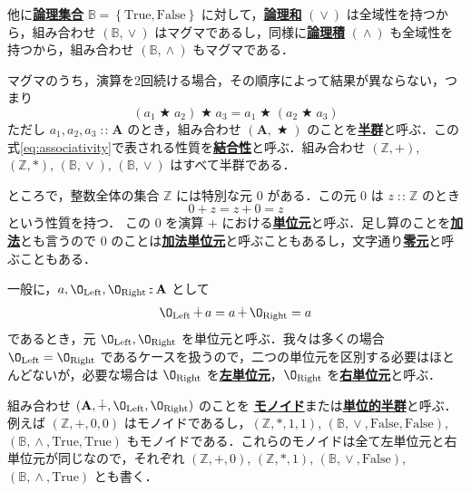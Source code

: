 \documentclass[a4paper,twocolumn]{jsbook}
\newcommand{\keyword}[1]{{\underline{\textbf{#1}}}}
\newcommand{\mSpecialConst}[1]{\mathrm{#1}} %
\newcommand{\mFalse}{\mSpecialConst{False}}
\newcommand{\mTrue}{\mSpecialConst{True}}
\newcommand{\mZero}{\O}
\DeclareMathOperator{\mBinOp}{\bigstar}
\DeclareMathOperator{\mIn}{{:\!:}}
\DeclareMathOperator{\mLogicalAnd}{\wedge}
\DeclareMathOperator{\mLogicalOr}{\vee}
\DeclareMathOperator{\mPlus}{\dotplus}
\newcommand{\mSpecialSub}[1]{\text{#1}}
\newcommand{\mLeft}{\mSpecialSub{Left}}
\newcommand{\mRight}{\mSpecialSub{Right}}
\newcommand{\mSet}[1]{\mathbf{#1}}
\newcommand{\mSpecialSet}[1]{\mathbb{#1}} %
\newcommand{\mBSet}{\mSpecialSet{B}}
\newcommand{\mZSet}{\mSpecialSet{Z}}
\newcommand{\mSetWith}[1]{\left\{#1\right\}}
\newcommand{\mTupleWith}[1]{\left(#1\right)}
\begin{document}
他に\keyword{論理集合} $\mBSet=\mSetWith{\mTrue,\mFalse}$ に対して，\keyword{論理和} $(\mLogicalOr)$ は全域性を持つから，組み合わせ $\mTupleWith{\mBSet,\mLogicalOr}$ はマグマであるし，同様に\keyword{論理積} $(\mLogicalAnd)$ も全域性を持つから，組み合わせ $\mTupleWith{\mBSet,\mLogicalAnd}$ もマグマである．

マグマのうち，演算を2回続ける場合，その順序によって結果が異ならない，つまり
\begin{equation}
\label{eq:associativity}
\left(a_1\mBinOp a_2\right)\mBinOp a_3
=a_1\mBinOp\left(a_2\mBinOp{a_3}\right)
\end{equation}
ただし $a_1,a_2,a_3\mIn\mSet{A}$ のとき，組み合わせ $\mTupleWith{\mSet{A},\mBinOp}$ のことを\keyword{半群}と呼ぶ．この式\eqref{eq:associativity}で表される性質を\keyword{結合性}と呼ぶ．組み合わせ $\mTupleWith{\mZSet,+}$, $\mTupleWith{\mZSet,*}$, $\mTupleWith{\mBSet,\mLogicalOr}$, $\mTupleWith{\mBSet,\mLogicalOr}$ はすべて半群である．

ところで，整数全体の集合 $\mZSet$ には特別な元 $0$ がある．この元 $0$ は $z\mIn\mZSet$ のとき
\begin{equation}
0+z=z+0=z
\end{equation}
という性質を持つ．
この $0$ を演算 $+$ における\keyword{単位元}と呼ぶ．足し算のことを\keyword{加法}とも言うので $0$ のことは\keyword{加法単位元}と呼ぶこともあるし，文字通り\keyword{零元}と呼ぶこともある．

一般に，$a,\mZero_\mLeft,\mZero_\mRight\mIn\mSet{A}$ として
\begin{equation}
\label{eq:identity}
\mZero_\mLeft\mPlus a=a\mPlus\mZero_\mRight=a
\end{equation}
であるとき，元 $\mZero_\mLeft,\mZero_\mRight$ を単位元と呼ぶ．我々は多くの場合 $\mZero_\mLeft=\mZero_\mRight$ であるケースを扱うので，二つの単位元を区別する必要はほとんどないが，必要な場合は $\mZero_\mRight$ を\keyword{左単位元}，$\mZero_\mRight$ を\keyword{右単位元}と呼ぶ．

組み合わせ $\mTupleWith{\mSet{A},\mPlus,\mZero_\mLeft,\mZero_\mRight}$ のことを
\keyword{モノイド}または\keyword{単位的半群}と呼ぶ．例えば $\mTupleWith{\mZSet,+,0,0}$ はモノイドであるし，$\mTupleWith{\mZSet,*,1,1}$, $\mTupleWith{\mBSet,\mLogicalOr,\mFalse,\mFalse}$, $\mTupleWith{\mBSet,\mLogicalAnd,\mTrue,\mTrue}$ もモノイドである．これらのモノイドは全て左単位元と右単位元が同じなので，それぞれ $\mTupleWith{\mZSet,+,0}$, $\mTupleWith{\mZSet,*,1}$, $\mTupleWith{\mBSet,\mLogicalOr,\mFalse}$, $\mTupleWith{\mBSet,\mLogicalAnd,\mTrue}$ とも書く．
\end{document}
